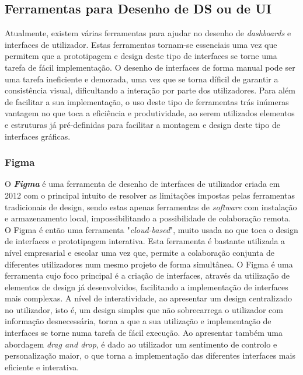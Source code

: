 \subsection{Ferramentas para Desenho de DS ou de UI} %
\label{sub:ferramentas}

Atualmente, existem várias ferramentas para ajudar no desenho de \textit{dashboards} e interfaces de utilizador. Estas ferramentas tornam-se essenciais uma vez que permitem que a prototipagem e design deste tipo de interfaces se torne uma tarefa de fácil implementação. O desenho de interfaces de forma manual pode ser uma tarefa ineficiente e demorada, uma vez que se torna díficil de garantir a consistência visual, dificultando a interação por parte dos utilizadores. Para além de facilitar a sua implementação, o uso deste tipo de ferramentas trás inúmeras vantagem no que toca a eficiência e produtividade, ao serem utilizados elementos e estruturas já pré-definidas para facilitar a montagem e design deste tipo de interfaces gráficas.

\subsubsection{Figma} %
\label{ssub:figma}

O \textbf{\textit{Figma}} \cite{figma} é uma ferramenta de desenho de interfaces de utilizador criada em 2012 com o principal intuito de resolver as limitações impostas pelas ferramentas tradicionais de design, sendo estas apenas ferramentas de \textit{software} com instalação e armazenamento local, impossibilitando a possibilidade de colaboração remota. O Figma é então uma ferramenta "\textit{cloud-based}", muito usada no que toca o design de interfaces e prototipagem interativa. Esta ferramenta é bastante utilizada a nível empresarial e escolar uma vez que, permite a colaboração conjunta de diferentes utilizadores num mesmo projeto de forma simultânea. O Figma é uma ferramenta cujo foco principal é a criação de interfaces, através da utilização de elementos de design já desenvolvidos, facilitando a implementação de interfaces mais complexas. A nível de interatividade, ao apresentar um design centralizado no utilizador, isto é, um design simples que não sobrecarrega o utilizador com informação desnecessária, torna a que a sua utilização e implementação de interfaces se torne numa tarefa de fácil execução. Ao apresentar também uma abordagem \textit{drag and drop}, é dado ao utilizador um sentimento de controlo e personalização maior, o que torna a implementação das diferentes interfaces mais eficiente e interativa.  %

